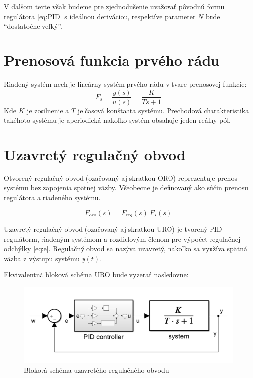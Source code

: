 \documentclass[a4paper,10pt]{article}
\begin{document}
V ďalšom texte však budeme pre zjednodušenie uvažovať pôvodnú formu regulátora \eqref{eq:PID} s ideálnou deriváciou, respektíve parameter $N$ bude ``dostatočne veľký''.

\section{Prenosová funkcia prvého rádu}
Riadený systém nech je lineárny systém prvého rádu v tvare prenosovej funkcie:
\begin{equation}
\label{eq:system_TF}
  F_s=\frac{y(s)}{u(s)}=\frac{K}{Ts+1}
\end{equation}
Kde $K$ je zosilnenie a $T$ je časová konštanta systému.
Prechodová charakteristika takéhoto systému je aperiodická nakoľko systém obsahuje jeden reálny pól.

\pagebreak

\section{Uzavretý regulačný obvod}
Otvorený regulačný obvod (ozačovaný aj skratkou ORO) reprezentuje prenos systému bez zapojenia spätnej väzby.
Všeobecne je definovaný ako súčin prenosu regulátora a riadeného systému.

\begin{equation}
\label{eq:ORO}
F_{oro}(s)=F_{reg}(s)\:F_{s}(s)
\end{equation}

Uzavretý regulačný obvod (ozačovaný aj skratkou URO) je tvorený PID regulátorm, riadeným systémom a rozdielovým členom pre výpočet regulačnej odchýlky \eqref{eq:e}. Regulačný obvod sa nazýva uzavretý, nakoľko sa využíva spätná väzba z výstupu systému $y(t)$. 

Ekvivalentná bloková schéma URO bude vyzerať nasledovne:

\begin{figure}[ht]
\centering
\includegraphics[scale=0.5]{PID_URO}
\caption{Bloková schéma uzavretého regulačného obvodu}
\end{figure}
\end{document}
